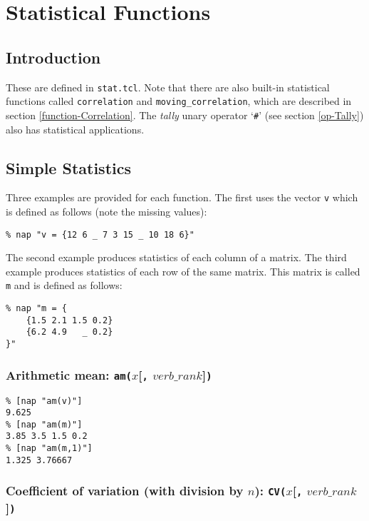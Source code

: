 
\section{Statistical Functions}
    \label{stat}

\subsection{Introduction}
    \label{stat-Introduction}

These are defined in \texttt{stat.tcl}.
Note that there are also built-in statistical functions called 
\texttt{correlation} and \texttt{moving\_correlation}, which are described in section
  \ref{function-Correlation}.
The {\em tally} unary operator `\texttt{\#}'
(see section \ref{op-Tally})
also has statistical applications.

\subsection{Simple Statistics}
    \label{stat-Simple-Statistics}

Three examples are provided for each function. The first uses the
  vector 
  \texttt{v} which is defined as follows (note the missing
  values):
  \begin{verbatim}
% nap "v = {12 6 _ 7 3 15 _ 10 18 6}"
\end{verbatim}

The second example produces statistics of each column of a matrix.
  The third example produces statistics of each row of the same matrix.
  This matrix is called 
  \texttt{m} and is defined as follows:
  \begin{verbatim}
% nap "m = {
    {1.5 2.1 1.5 0.2}
    {6.2 4.9   _ 0.2}
}"
\end{verbatim}

\subsubsection{Arithmetic mean: \texttt{am(}$x$[\texttt{,} $\mathit{verb\_rank}$]\texttt{)}}
    \label{stat-am}

  \begin{verbatim}
% [nap "am(v)"]
9.625
% [nap "am(m)"]
3.85 3.5 1.5 0.2
% [nap "am(m,1)"]
1.325 3.76667
\end{verbatim}

\subsubsection{Coefficient of variation (with division by $n$):
\texttt{CV(}$x$[\texttt{,} $\mathit{verb\_rank}$]\texttt{)}}
    \label{stat-CV}

